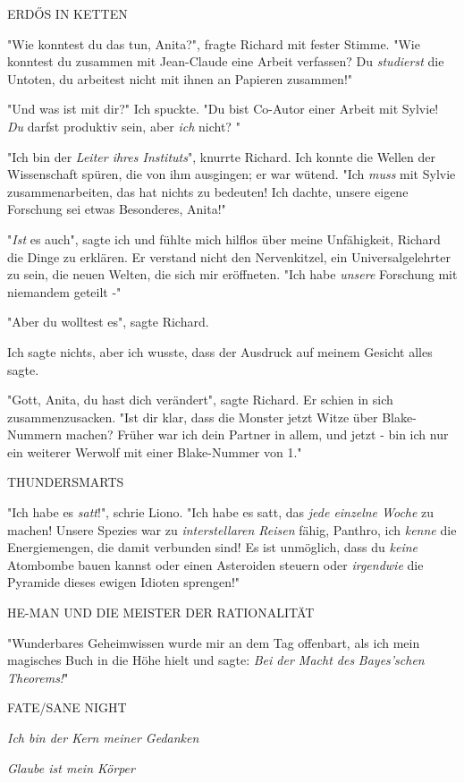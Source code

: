 {ERDŐS IN KETTEN

"Wie konntest du das tun, Anita?", fragte Richard mit fester Stimme. "Wie konntest du zusammen mit Jean-Claude eine Arbeit verfassen? Du \emph{studierst} die Untoten, du arbeitest nicht mit ihnen an Papieren zusammen!"

"Und was ist mit dir?" Ich spuckte. "Du bist Co-Autor einer Arbeit mit Sylvie! \emph{Du} darfst produktiv sein, aber \emph{ich} nicht? "

"Ich bin der \emph{Leiter ihres Instituts}", knurrte Richard. Ich konnte die Wellen der Wissenschaft spüren, die von ihm ausgingen; er war wütend. "Ich \emph{muss} mit Sylvie zusammenarbeiten, das hat nichts zu bedeuten! Ich dachte, unsere eigene Forschung sei etwas Besonderes, Anita!"

"\emph{Ist} es auch", sagte ich und fühlte mich hilflos über meine Unfähigkeit, Richard die Dinge zu erklären. Er verstand nicht den Nervenkitzel, ein Universalgelehrter zu sein, die neuen Welten, die sich mir eröffneten. "Ich habe \emph{unsere} Forschung mit niemandem geteilt -"

"Aber du wolltest es", sagte Richard.

Ich sagte nichts, aber ich wusste, dass der Ausdruck auf meinem Gesicht alles sagte.

"Gott, Anita, du hast dich verändert", sagte Richard. Er schien in sich zusammenzusacken. "Ist dir klar, dass die Monster jetzt Witze über Blake-Nummern machen? Früher war ich dein Partner in allem, und jetzt - bin ich nur ein weiterer Werwolf mit einer Blake-Nummer von 1."

THUNDERSMARTS

"Ich habe es \emph{satt}!", schrie Liono. "Ich habe es satt, das \emph{jede einzelne Woche} zu machen! Unsere Spezies war zu \emph{interstellaren Reisen} fähig, Panthro, ich \emph{kenne} die Energiemengen, die damit verbunden sind! Es ist unmöglich, dass du \emph{keine} Atombombe bauen kannst oder einen Asteroiden steuern oder \emph{irgendwie} die Pyramide dieses ewigen Idioten sprengen!"

HE-MAN UND DIE MEISTER DER RATIONALITÄT

"Wunderbares Geheimwissen wurde mir an dem Tag offenbart, als ich mein magisches Buch in die Höhe hielt und sagte: \emph{Bei der Macht des} \emph{Bayes'schen} \emph{Theorems!}"

FATE/SANE NIGHT

\emph{Ich bin der Kern meiner Gedanken}

\emph{Glaube ist mein Körper}

}
